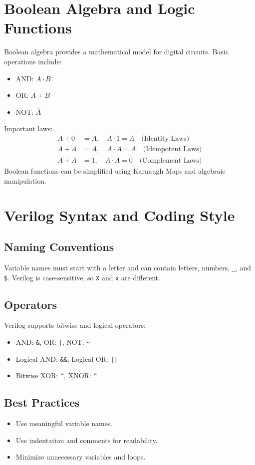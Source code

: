 \documentclass{article}
\begin{document}
\section{Boolean Algebra and Logic Functions}
Boolean algebra provides a mathematical model for digital circuits. Basic operations include:
\begin{itemize}
    \item AND: \( A \cdot B \)
    \item OR: \( A + B \)
    \item NOT: \( \overline{A} \)
\end{itemize}

Important laws:
\begin{align}
    A + 0 &= A, \quad A \cdot 1 = A \quad \text{(Identity Laws)} \\
    A + A &= A, \quad A \cdot A = A \quad \text{(Idempotent Laws)} \\
    A + \overline{A} &= 1, \quad A \cdot \overline{A} = 0 \quad \text{(Complement Laws)}
\end{align}
Boolean functions can be simplified using Karnaugh Maps and algebraic manipulation.

\section{Verilog Syntax and Coding Style}
\subsection{Naming Conventions}
Variable names must start with a letter and can contain letters, numbers, \texttt{\_}, and \texttt{\$}. Verilog is case-sensitive, so \texttt{X} and \texttt{x} are different.

\subsection{Operators}
Verilog supports bitwise and logical operators:
\begin{itemize}
    \item AND: \texttt{\&}, OR: \texttt{|}, NOT: \texttt{\textasciitilde}
    \item Logical AND: \texttt{\&\&}, Logical OR: \texttt{||}
    \item Bitwise XOR: \texttt{\^}, XNOR: \texttt{\^{}~}
\end{itemize}

\subsection{Best Practices}
\begin{itemize}
    \item Use meaningful variable names.
    \item Use indentation and comments for readability.
    \item Minimize unnecessary variables and loops.
\end{itemize}
\end{document}
